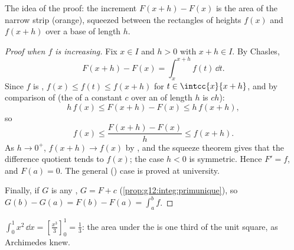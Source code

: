 \begin{omfigure}

{\small The idea of the proof: the increment $F(x+h) - F(x)$ is the area
of the narrow strip (orange), squeezed between the rectangles of heights
$f(x)$ and $f(x+h)$ over a base of length $h$.}
\end{omfigure}

\begin{proof}[Proof when $f$ is increasing]
Fix $x \in I$ and $h > 0$ with $x + h \in I$. By Chasles,
\[
F(x+h) - F(x) = \int_x^{x+h} f(t)\,\dd t .
\]
Since $f$ is , $f(x) \leq f(t) \leq f(x+h)$ for
$t \in \intcc{x}{x+h}$, and by comparison of  (the  of a
constant $c$ over an  of length $h$ is $ch$):
\[
h\,f(x) \leq F(x+h) - F(x) \leq h\,f(x+h),
\]
so
\[
f(x) \leq \frac{F(x+h) - F(x)}{h} \leq f(x+h).
\]
As $h \to 0^+$, $f(x+h) \to f(x)$ by , and the squeeze theorem
gives that the difference quotient tends to $f(x)$; the case $h < 0$ is
symmetric. Hence $F' = f$, and $F(a) = 0$. The general ()
 case is proved at university.

Finally, if $G$ is any , $G = F + c$
(\cref{prop:g12:integ:primunique}), so
$G(b) - G(a) = F(b) - F(a) = \int_a^b f$.
\end{proof}

\begin{example}
$\displaystyle\int_0^1 x^2\,\dd x = \left[\frac{x^3}{3}\right]_0^1 =
\frac13$: the area under the  is one third of the unit square, as
Archimedes knew.
\end{example}

